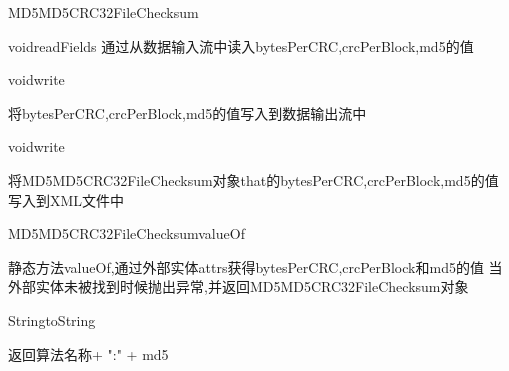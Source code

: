 \begin{XeClass}{MD5MD5CRC32FileChecksum}
\begin{XeMethod}{\XePublic}{void}{readFields}
 通过从数据输入流中读入bytesPerCRC,crcPerBlock,md5的值

    \end{XeMethod}

    \begin{XeMethod}{\XePublic}{void}{write}
         
 将bytesPerCRC,crcPerBlock,md5的值写入到数据输出流中

    \end{XeMethod}

    \begin{XeMethod}{\XePublic}{void}{write}
         
 将MD5MD5CRC32FileChecksum对象that的bytesPerCRC,crcPerBlock,md5的值写入到XML文件中

    \end{XeMethod}

    \begin{XeMethod}{\XePublic}{MD5MD5CRC32FileChecksum}{valueOf}
         
 静态方法valueOf,通过外部实体attrs获得bytesPerCRC,crcPerBlock和md5的值
 当外部实体未被找到时候抛出异常,并返回MD5MD5CRC32FileChecksum对象

    \end{XeMethod}

    \begin{XeMethod}{\XePublic}{String}{toString}
         
 返回算法名称+ ":" + md5

    \end{XeMethod}

\end{XeClass}
